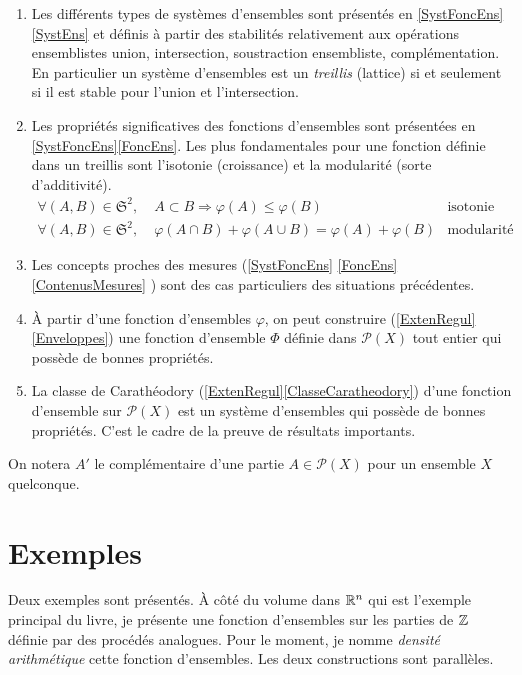 \begin{enumerate}
 \item  Les différents types de systèmes d'ensembles sont présentés en \ref{SystFoncEns}\ref{SystEns} et définis à partir des stabilités relativement aux opérations ensemblistes union, intersection, soustraction ensembliste, complémentation.\newline
 En particulier un système d'ensembles est un \emph{treillis} (lattice) si et seulement si il est stable pour l'union et l'intersection.
 \item Les propriétés significatives des fonctions d'ensembles sont présentées en \ref{SystFoncEns}\ref{FoncEns}. Les plus fondamentales pour une fonction définie dans un treillis sont l'isotonie (croissance) et la modularité (sorte d'additivité).
 \begin{displaymath}
   \begin{aligned}
     \forall (A,B) \in \mathfrak{S}^2, \;& A \subset B \Rightarrow \varphi(A) \leq \varphi(B) &\text{isotonie}& \\
     \forall (A,B) \in \mathfrak{S}^2, \;&  \varphi(A\cap B) + \varphi(A \cup B) = \varphi(A) + \varphi(B) &\text{modularité}&
   \end{aligned}
 \end{displaymath}

 \item Les concepts proches des mesures (\ref{SystFoncEns} \ref{FoncEns} \ref{ContenusMesures} ) sont des cas particuliers des situations précédentes.
 \item À partir d'une fonction d'ensembles $\varphi$, on peut construire (\ref{ExtenRegul} \ref{Enveloppes}) une fonction d'ensemble $\Phi$ définie dans $\mathcal{P}(X)$ tout entier qui possède de bonnes propriétés.
 \item La classe de Carathéodory (\ref{ExtenRegul}\ref{ClasseCaratheodory}) d'une fonction d'ensemble sur $\mathcal{P}(X)$ est un système d'ensembles qui possède de bonnes propriétés. C'est le cadre de la preuve de résultats importants.
\end{enumerate}

On notera $A'$ le complémentaire d'une partie $A \in \mathcal{P}(X)$ pour un ensemble $X$ quelconque.
\newpage

\section{Exemples}\label{Exples}
Deux exemples sont présentés. À côté du volume dans $\mathbb{R}^n$ qui est l'exemple principal du livre, je présente une fonction d'ensembles sur les parties de $\mathbb{Z}$ définie par des procédés analogues. Pour le moment, je nomme \emph{densité arithmétique} cette fonction d'ensembles. Les deux constructions sont parallèles.

